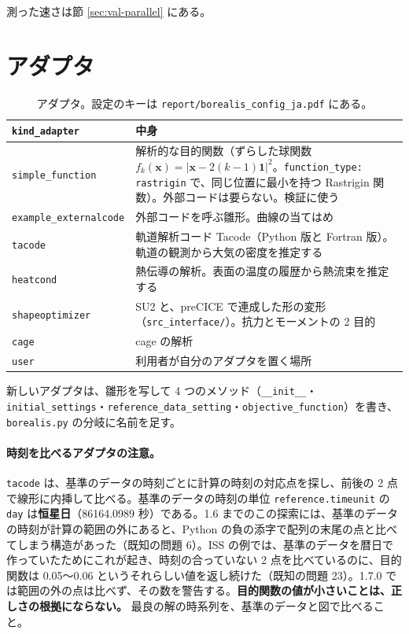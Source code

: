 \documentclass[11pt,a4paper,dvipdfmx]{jsarticle}
\begin{document}
測った速さは節 \ref{sec:val-parallel} にある。

\section{アダプタ}\label{sec:adapters}

\begin{table}[h]
\centering
\small
\begin{tabularx}{\linewidth}{lX}
\toprule
\texttt{kind\_adapter} & 中身 \\
\midrule
\texttt{simple\_function} & 解析的な目的関数（ずらした球関数 $f_k(\mathbf{x}) = |\mathbf{x} - 2(k-1)\mathbf{1}|^2$。\texttt{function\_type: rastrigin} で、同じ位置に最小を持つ Rastrigin 関数）。外部コードは要らない。検証に使う \\
\texttt{example\_externalcode} & 外部コードを呼ぶ雛形。曲線の当てはめ \\
\texttt{tacode} & 軌道解析コード Tacode（Python 版と Fortran 版）。軌道の観測から大気の密度を推定する \cite{takahashi2022,sakai2024} \\
\texttt{heatcond} & 熱伝導の解析。表面の温度の履歴から熱流束を推定する \\
\texttt{shapeoptimizer} & SU2 と、preCICE で連成した形の変形（\texttt{src\_interface/}）。抗力とモーメントの 2 目的 \\
\texttt{cage} & cage の解析 \\
\texttt{user} & 利用者が自分のアダプタを置く場所 \\
\bottomrule
\end{tabularx}
\caption{アダプタ。設定のキーは \texttt{report/borealis\_config\_ja.pdf} にある。}
\end{table}

新しいアダプタは、雛形を写して 4 つのメソッド（\texttt{\_\_init\_\_}・\texttt{initial\_settings}・\texttt{reference\_data\_setting}・\texttt{objective\_function}）を書き、\texttt{borealis.py} の分岐に名前を足す。

\paragraph{時刻を比べるアダプタの注意。} \texttt{tacode} は、基準のデータの時刻ごとに計算の時刻の対応点を探し、前後の 2 点で線形に内挿して比べる。基準のデータの時刻の単位 \texttt{reference.timeunit} の \texttt{day} は\textbf{恒星日}（86164.0989 秒）である。1.6 までのこの探索には、基準のデータの時刻が計算の範囲の外にあると、Python の負の添字で配列の末尾の点と比べてしまう構造があった（既知の問題 6）。ISS の例では、基準のデータを暦日で作っていたためにこれが起き、時刻の合っていない 2 点を比べているのに、目的関数は 0.05〜0.06 というそれらしい値を返し続けた（既知の問題 23）。1.7.0 では範囲の外の点は比べず、その数を警告する。\textbf{目的関数の値が小さいことは、正しさの根拠にならない。} 最良の解の時系列を、基準のデータと図で比べること。
\end{document}
